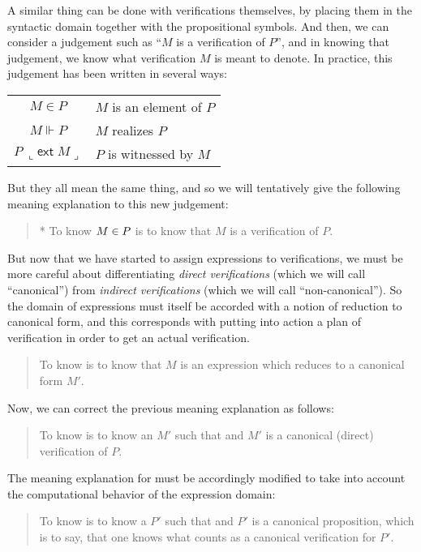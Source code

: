 \documentclass[main.tex]{subfiles}
\begin{document}
A similar thing can be done with verifications themselves, by placing them in
the syntactic domain together with the propositional symbols. And then, we can
consider a judgement such as ``$M$ is a verification of $P$'', and in knowing
that judgement, we know what verification $M$ is meant to denote. In practice,
this judgement has been written in several ways:\\\medskip
\begin{tabular}{c|l}
  $M\in P$ & $M$ is an element of $P$\\
  $M\Vdash P$ & $M$ realizes $P$\\
  $P\ \llcorner\mathsf{ext}\; M\lrcorner$ & $P$ is witnessed by $M$
\end{tabular}

But they all mean the same thing, and so we will tentatively give the following
meaning explanation to this new judgement:
\begin{quote}
  * To know $M\in P$ is to know that $M$ is a verification of $P$.
\end{quote}

But now that we have started to assign expressions to verifications, we must be
more careful about differentiating \emph{direct verifications} (which we will
call ``canonical'') from \emph{indirect verifications} (which we will call
``non-canonical''). So the domain of expressions must itself be accorded with a
notion of reduction to canonical form, and this corresponds with putting into
action a plan of verification in order to get an actual verification.

\begin{quote}
  To know  is to know that $M$ is an expression which reduces to
  a canonical form $M'$.
\end{quote}

Now, we can correct the previous meaning explanation as follows:

\begin{quote}
  To know  is to know an $M'$ such that  and $M'$ is a
  canonical (direct) verification of $P$.
\end{quote}

The meaning explanation for  must be accordingly modified to take
into account the computational behavior of the expression domain:

\begin{quote}
  To know  is to know a $P'$ such that  and $P'$ is a
  canonical proposition, which is to say, that one knows what counts as a
  canonical verification for $P'$.
\end{quote}
\end{document}

